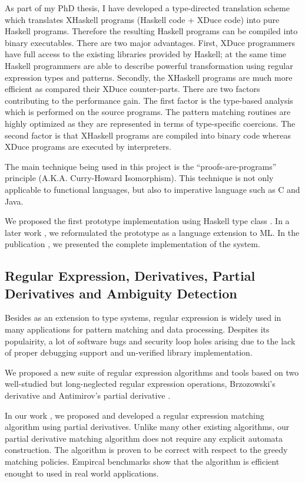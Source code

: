 \documentclass[12pt]{article}
\theoremstyle{plain} \numberwithin{equation}{section}
\theoremstyle{definition}
\begin{document}
As part of my PhD thesis, I have developed a
type-directed translation scheme which translates XHaskell programs
(Haskell code + XDuce code) into pure Haskell programs. Therefore
the resulting Haskell programs can be compiled into binary executables.
There are two major advantages. First, XDuce programmers have full
access to the existing libraries provided by Haskell; at the same
time Haskell programmers are able to describe powerful transformation
using regular expression types and patterns. Secondly, the XHaskell
programs are much more efficient as compared their XDuce counter-parts.
There are two factors contributing to the performance gain. 
The first factor is the type-based analysis which is performed on the 
source programs. The pattern matching routines are highly optimized
as they are represented in terms of type-specific coercions. The second 
factor is that XHaskell programs are compiled into binary code whereas
XDuce programs are executed by interpreters.

The main technique being used in this project is the
``proofs-are-programs'' principle (A.K.A. Curry-Howard Isomorphism). 
This technique is not only applicable to functional
languages, but also to imperative language such as C and Java.

We proposed the first prototype implementation using Haskell type class
 \cite{semantic-subtyping}. In a later work \cite{ml-workshop05}, 
we reformulated the prototype as a language extension to ML.
In the publication \cite{DBLP:conf/ifl/SulzmannL07}, we presented the complete implementation of the system.


\subsection{Regular Expression, Derivatives, Partial Derivatives and
  Ambiguity Detection}

Besides as an extension to type systems, regular expression is widely used in many
applications for pattern matching and data processing.
Despites its populairity, a lot of software bugs and security loop holes arising due to the
lack of proper debugging support and un-verified library implementation. 

We proposed a new suite of regular expression algorithms and tools based on two well-studied
but long-neglected regular expression operations,
Brzozowski's derivative \cite{321249} and Antimirov's partial derivative \cite{Antimirov96Partial}.

In our work \cite{DBLP:conf/ppdp/SulzmannL12}, we proposed and developed a regular expression
matching algorithm using partial derivatives. Unlike many other existing algorithms, our
partial derivative matching algorithm does not require any explicit automata construction.
The algorithm is proven to be correct with respect to the greedy matching policies. Empircal
benchmarks show that the algorithm is efficient enought to used in real world applications.
\end{document}
